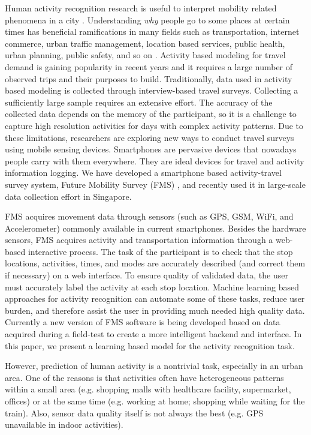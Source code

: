 \documentclass{sig-alternate}
\begin{document}
Human activity recognition research is useful to interpret mobility related phenomena in a city \cite{Song2010ModellingMobility}. Understanding \emph{why} people go to some places at certain times has beneficial ramifications in many fields such as transportation, internet commerce, urban traffic management, location based services, public health, urban planning, public safety, and so on \cite{May2008nextDMchapter}. Activity based modeling for travel demand is gaining popularity in recent years and it requires a large number of observed trips and their purposes to build. Traditionally, data used in activity based modeling is collected through interview-based travel surveys. Collecting a sufficiently large sample requires an extensive effort. The accuracy of the collected data depends on the memory of the participant, so it is a challenge to capture high resolution activities for days with complex activity patterns. Due to these limitations, researchers are exploring new ways to conduct travel surveys using mobile sensing devices. Smartphones are pervasive devices that nowadays people carry with them everywhere. They are ideal devices for travel and activity information logging. We have developed a smartphone based activity-travel survey system,  Future Mobility Survey (FMS) \cite{Cottrill2013FMS}, and recently used it in large-scale data collection effort in Singapore.

 FMS acquires movement data through sensors (such as GPS, GSM, WiFi, and Accelerometer) commonly available in current smartphones. Besides the hardware sensors, FMS acquires activity and transportation information through a web-based interactive process. The task of the participant is to check that the stop locations, activities, times, and modes are accurately described (and correct them if necessary) on a web interface. To ensure quality of validated data, the user must accurately label the activity at each stop location. Machine learning based approaches for activity recognition can automate some of these tasks, reduce user burden, and therefore assist the user in providing much needed high quality data. Currently a new version of FMS software is being developed based on data acquired during a field-test to create a more intelligent backend and interface.
In this paper, we present a learning based model for the activity recognition task.

However, prediction of human activity is a nontrivial task, especially in an urban area. One of the reasons is that activities  often have heterogeneous patterns within a small area (e.g. shopping malls with healthcare facility, supermarket, offices) or at the same time (e.g. working at home; shopping while waiting for the train).  Also, sensor data quality itself is not always the best (e.g. GPS unavailable in indoor activities).
\end{document}
